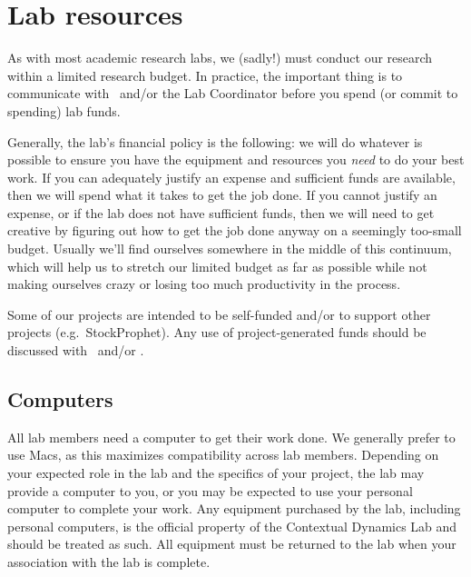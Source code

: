 \documentclass{tufte-book} %
\begin{document}
 \section{Lab resources}
 As with most academic research labs, we (sadly!) must conduct our
 research within a limited research budget.  In practice, the
 important thing is to communicate with \director~and/or the Lab
 Coordinator before you spend (or commit to spending) lab funds.

 Generally, the lab's financial policy is the following: we will do
 whatever is possible to ensure you have the equipment and resources
 you \textit{need} to do your best work.  If you can adequately
 justify an expense and sufficient funds are available, then we will
 spend what it takes to get the job done.  If you cannot justify an
 expense, or if the lab does not have sufficient funds, then we will
 need to get creative by figuring out how to get the job done anyway
 on a seemingly too-small budget.  Usually we'll find ourselves
 somewhere in the middle of this continuum, which will help us to
 stretch our limited budget as far as possible while not making
 ourselves crazy or losing too much productivity in the process.

 Some of our projects are intended to be self-funded and/or to support
 other projects (e.g.\ StockProphet).  Any use of project-generated
 funds should be discussed with \director~and/or \coordinator.

 \subsection{Computers}
All lab members need a computer to get their work done.  We generally
prefer to use Macs, as this maximizes compatibility across lab
members.  Depending on your expected role in the lab and the specifics
of your project, the lab may provide a computer to you, or you may be
expected to use your personal computer to complete your work.  Any
equipment purchased by the lab, including personal computers, is the
official property of the Contextual Dynamics Lab and should be treated
as such.  All equipment must be returned to the lab when your
association with the lab is complete.
\end{document}
